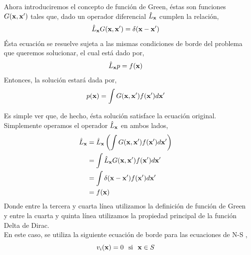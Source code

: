 \documentclass[executivepaper,12pt]{article}
\numberwithin{equation}{section}
\begin{document}
Ahora introduciremos el concepto de función de Green, éstas son funciones $G(\vb{x},\vb{x}')$ tales que, dado un operador diferencial $\hat{L}_{\vb{x}}$ cumplen la relación,
\begin{equation*}
	\hat{L}_{\vb{x}}G(\vb{x},\vb{x}')=\delta(\vb{x}-\vb{x}')
\end{equation*}
Ésta ecuación se resuelve sujeta a las mismas condiciones de borde del problema que queremos solucionar, el cual está dado por,
\begin{equation*}
	\hat{L}_{\vb{x}} p =f(\vb{x})
\end{equation*}
Entonces, la solución estará dada por,
\begin{equation*}
	p(\vb{x})=\int G(\vb{x},\vb{x}')f(\vb{x}')d\vb{x}'
\end{equation*}

Es simple ver que, de hecho, ésta solución satisface la ecuación original. Simplemente operamos el operador $\hat{L}_{\vb{x}}$ en ambos lados,
\begin{align*}
	\hat{L}_{\vb{x}}&=\hat{L}_{\vb{x}}\left(\int G(\vb{x},\vb{x}')f(\vb{x}')d\vb{x}'\right)\\
	&=\int \hat{L}_{\vb{x}}G(\vb{x},\vb{x}')f(\vb{x}')d\vb{x}'\\
	&=\int \delta(\vb{x}-\vb{x}')f(\vb{x}')d\vb{x}'\\
	&=f(\vb{x})
\end{align*}
Donde entre la tercera y cuarta línea utilizamos la definición de función de Green y entre la cuarta y quinta línea utilizamos la propiedad principal de la función Delta de Dirac. \\
En este caso, se utiliza la siguiente ecuación de borde para las ecuaciones de N-S \parencite{mccomb1990},
\begin{equation*}
	v_i(\vb{x})=0\hspace{0.25cm}\text{si}\hspace{0.25cm} \vb{x}\in S 
\end{equation*}
\end{document}
